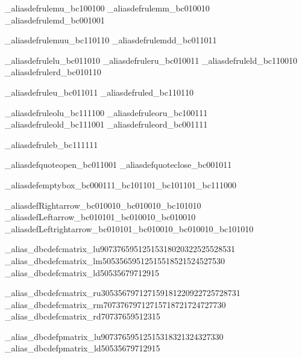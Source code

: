 \brl@char_aliasdef{rulemu}{\brl@char_bc100100}
\brl@char_aliasdef{rulemm}{\brl@char_bc010010}
\brl@char_aliasdef{rulemd}{\brl@char_bc001001}

\brl@char_aliasdef{rulemuu}{\brl@char_bc110110}
\brl@char_aliasdef{rulemdd}{\brl@char_bc011011}

\brl@char_aliasdef{rulelu}{\brl@char_bc011010}
\brl@char_aliasdef{ruleru}{\brl@char_bc010011}
\brl@char_aliasdef{ruleld}{\brl@char_bc110010}
\brl@char_aliasdef{rulerd}{\brl@char_bc010110}

\brl@char_aliasdef{ruleu}{\brl@char_bc011011}
\brl@char_aliasdef{ruled}{\brl@char_bc110110}

\brl@char_aliasdef{ruleolu}{\brl@char_bc111100}
\brl@char_aliasdef{ruleoru}{\brl@char_bc100111}
\brl@char_aliasdef{ruleold}{\brl@char_bc111001}
\brl@char_aliasdef{ruleord}{\brl@char_bc001111}

\brl@char_aliasdef{ruleb}{\brl@char_bc111111}


\brl@char_aliasdef{quoteopen}{\brl@char_bc011001}
\brl@char_aliasdef{quoteclose}{\brl@char_bc001011}

\brl@char_aliasdef{emptybox}{\brl@char_bc000111\brl@char_bc101101\brl@char_bc101101\brl@char_bc111000}

\brl@char_aliasdef{Rightarrow}{\brl@char_bc010010\brl@char_bc010010\brl@char_bc101010}%
\brl@char_aliasdef{Leftarrow}{\brl@char_bc010101\brl@char_bc010010\brl@char_bc010010}%
\brl@char_aliasdef{Leftrightarrow}{\brl@char_bc010101\brl@char_bc010010\brl@char_bc010010\brl@char_bc101010}%





\brl@char_alias_dbcdef{cmatrix_lu}{{9}{0}{7}{3}{7}{6}{5}{9}{5}{12}{5}{15}{3}{18}{0}{20}{3}{22}{5}{25}{5}{28}{5}{31}}
\brl@char_alias_dbcdef{cmatrix_lm}{{5}{0}{5}{3}{5}{6}{5}{9}{5}{12}{5}{15}{5}{18}{5}{21}{5}{24}{5}{27}{5}{30}}
\brl@char_alias_dbcdef{cmatrix_ld}{{5}{0}{5}{3}{5}{6}{7}{9}{7}{12}{9}{15}}

\brl@char_alias_dbcdef{cmatrix_ru}{{3}{0}{5}{3}{5}{6}{7}{9}{7}{12}{7}{15}{9}{18}{12}{20}{9}{22}{7}{25}{7}{28}{7}{31}}
\brl@char_alias_dbcdef{cmatrix_rm}{{7}{0}{7}{3}{7}{6}{7}{9}{7}{12}{7}{15}{7}{18}{7}{21}{7}{24}{7}{27}{7}{30}}
\brl@char_alias_dbcdef{cmatrix_rd}{{7}{0}{7}{3}{7}{6}{5}{9}{5}{12}{3}{15}}


\brl@char_alias_dbcdef{pmatrix_lu}{{9}{0}{7}{3}{7}{6}{5}{9}{5}{12}{5}{15}{3}{18}{3}{21}{3}{24}{3}{27}{3}{30}}
\brl@char_alias_dbcdef{pmatrix_ld}{{5}{0}{5}{3}{5}{6}{7}{9}{7}{12}{9}{15}}

